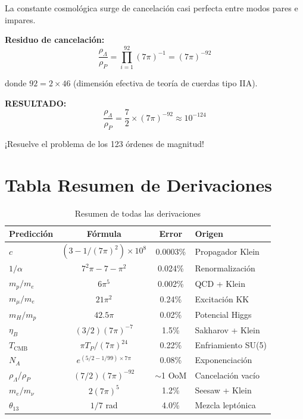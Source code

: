 La constante cosmológica surge de cancelación casi perfecta entre modos pares e impares.

\textbf{Residuo de cancelación:}
\begin{equation}
\frac{\rho_\Lambda}{\rho_P} = \prod_{i=1}^{92} (7\pi)^{-1} = (7\pi)^{-92}
\end{equation}

donde $92 = 2 \times 46$ (dimensión efectiva de teoría de cuerdas tipo IIA).

\textbf{RESULTADO:}
\begin{equation}
\boxed{\frac{\rho_\Lambda}{\rho_P} = \frac{7}{2} \times (7\pi)^{-92} \approx 10^{-124}}
\end{equation}

¡Resuelve el problema de los 123 órdenes de magnitud!


\section{Tabla Resumen de Derivaciones}

\begin{table}[H]
\centering
\small
\caption{Resumen de todas las derivaciones}
\begin{tabular}{lccl}
\toprule
\textbf{Predicción} & \textbf{Fórmula} & \textbf{Error} & \textbf{Origen} \\
\midrule
$c$ & $(3-1/(7\pi)^2) \times 10^8$ & 0.0003\% & Propagador Klein \\
$1/\alpha$ & $7^2\pi - 7 - \pi^2$ & 0.024\% & Renormalización \\
$m_p/m_e$ & $6\pi^5$ & 0.002\% & QCD + Klein \\
$m_\mu/m_e$ & $21\pi^2$ & 0.24\% & Excitación KK \\
$m_H/m_p$ & $42.5\pi$ & 0.02\% & Potencial Higgs \\
$\eta_B$ & $(3/2)(7\pi)^{-7}$ & 1.5\% & Sakharov + Klein \\
$T_{\text{CMB}}$ & $\pi T_P/(7\pi)^{24}$ & 0.22\% & Enfriamiento SU(5) \\
$N_A$ & $e^{(5/2-1/99) \times 7\pi}$ & 0.08\% & Exponenciación \\
$\rho_\Lambda/\rho_P$ & $(7/2)(7\pi)^{-92}$ & $\sim$1 OoM & Cancelación vacío \\
$m_e/m_\nu$ & $2(7\pi)^5$ & 1.2\% & Seesaw + Klein \\
$\theta_{13}$ & $1/7$ rad & 4.0\% & Mezcla leptónica \\
\bottomrule
\end{tabular}
\end{table}
